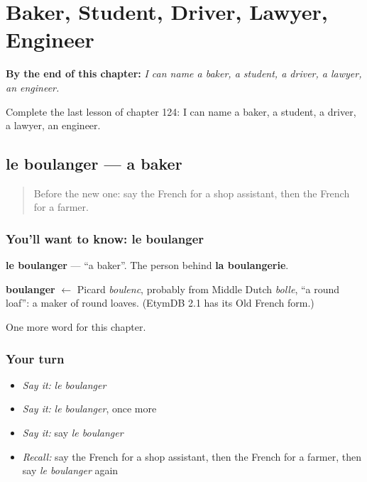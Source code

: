 
\chapter{Baker, Student, Driver, Lawyer, Engineer}
\label{ch:fr-baker-student-driver-lawyer-engineer}

\begin{chapteropening}
\textbf{By the end of this chapter:} \emph{I can name a baker, a student, a driver, a lawyer, an engineer.}

Complete the last lesson of chapter 124: I can name a baker, a student, a driver, a lawyer, an engineer.
\end{chapteropening}

\section[le boulanger]{le boulanger — a baker}

\label{lesson:FR-C124-boulanger}



\begin{quote}
Before the new one: say the French for a shop assistant, then the French for a farmer.
\end{quote}

\subsection*{You'll want to know: le boulanger}
\textbf{le boulanger} — \textquotedblleft{}a baker\textquotedblright{}. The person behind \textbf{la boulangerie}.

\begin{cousinweb}
\textbf{boulanger} $\leftarrow$ Picard \emph{boulenc}, probably from Middle Dutch \emph{bolle}, \textquotedblleft{}a round loaf\textquotedblright{}: a maker of round loaves. (EtymDB 2.1 has its Old French form.)
\end{cousinweb}

\begin{grammarlens}[title={What you've built}]
One more word for this chapter.
\end{grammarlens}

\subsection*{Your turn}
\begin{itemize}
\raggedright
  \item \emph{Say it:} \emph{le boulanger}
  \item \emph{Say it:} \emph{le boulanger}, once more
  \item \emph{Say it:} say \emph{le boulanger}
  \item \emph{Recall:} say the French for a shop assistant, then the French for a farmer, then say \emph{le boulanger} again
\end{itemize}

